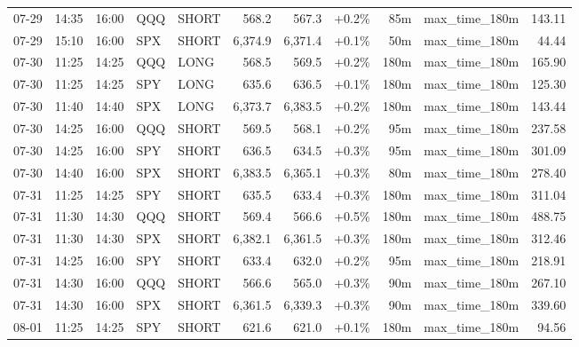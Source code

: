 \documentclass[11pt,a4paper,twoside]{article}
\begin{document}
\begin{center}
\begin{longtable}{>{\color{txtmain}}l l l l l r r r r >{\color{txtmain}}l r}
07-29 & 14:35 & 16:00 & QQQ & SHORT & 568.2 & 567.3 & \textcolor{wingreen}{+0.2\%} & 85m & max\_time\_180m & \textcolor{wingreen}{143.11} \\
07-29 & 15:10 & 16:00 & SPX & SHORT & 6,374.9 & 6,371.4 & \textcolor{wingreen}{+0.1\%} & 50m & max\_time\_180m & \textcolor{wingreen}{44.44} \\
07-30 & 11:25 & 14:25 & QQQ & LONG & 568.5 & 569.5 & \textcolor{wingreen}{+0.2\%} & 180m & max\_time\_180m & \textcolor{wingreen}{165.90} \\
07-30 & 11:25 & 14:25 & SPY & LONG & 635.6 & 636.5 & \textcolor{wingreen}{+0.1\%} & 180m & max\_time\_180m & \textcolor{wingreen}{125.30} \\
07-30 & 11:40 & 14:40 & SPX & LONG & 6,373.7 & 6,383.5 & \textcolor{wingreen}{+0.2\%} & 180m & max\_time\_180m & \textcolor{wingreen}{143.44} \\
07-30 & 14:25 & 16:00 & QQQ & SHORT & 569.5 & 568.1 & \textcolor{wingreen}{+0.2\%} & 95m & max\_time\_180m & \textcolor{wingreen}{237.58} \\
07-30 & 14:25 & 16:00 & SPY & SHORT & 636.5 & 634.5 & \textcolor{wingreen}{+0.3\%} & 95m & max\_time\_180m & \textcolor{wingreen}{301.09} \\
07-30 & 14:40 & 16:00 & SPX & SHORT & 6,383.5 & 6,365.1 & \textcolor{wingreen}{+0.3\%} & 80m & max\_time\_180m & \textcolor{wingreen}{278.40} \\
07-31 & 11:25 & 14:25 & SPY & SHORT & 635.5 & 633.4 & \textcolor{wingreen}{+0.3\%} & 180m & max\_time\_180m & \textcolor{wingreen}{311.04} \\
07-31 & 11:30 & 14:30 & QQQ & SHORT & 569.4 & 566.6 & \textcolor{wingreen}{+0.5\%} & 180m & max\_time\_180m & \textcolor{wingreen}{488.75} \\
07-31 & 11:30 & 14:30 & SPX & SHORT & 6,382.1 & 6,361.5 & \textcolor{wingreen}{+0.3\%} & 180m & max\_time\_180m & \textcolor{wingreen}{312.46} \\
07-31 & 14:25 & 16:00 & SPY & SHORT & 633.4 & 632.0 & \textcolor{wingreen}{+0.2\%} & 95m & max\_time\_180m & \textcolor{wingreen}{218.91} \\
07-31 & 14:30 & 16:00 & QQQ & SHORT & 566.6 & 565.0 & \textcolor{wingreen}{+0.3\%} & 90m & max\_time\_180m & \textcolor{wingreen}{267.10} \\
07-31 & 14:30 & 16:00 & SPX & SHORT & 6,361.5 & 6,339.3 & \textcolor{wingreen}{+0.3\%} & 90m & max\_time\_180m & \textcolor{wingreen}{339.60} \\
08-01 & 11:25 & 14:25 & SPY & SHORT & 621.6 & 621.0 & \textcolor{wingreen}{+0.1\%} & 180m & max\_time\_180m & \textcolor{wingreen}{94.56} \\

\end{longtable}
\end{center}
\end{document}
